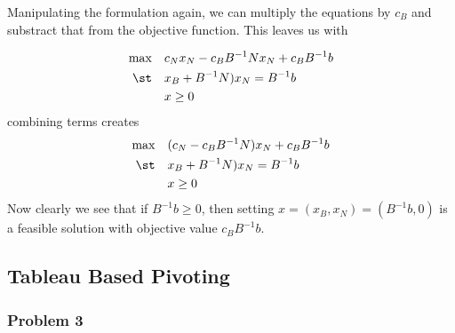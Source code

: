 Manipulating the formulation again, we can multiply the equations by $c_B$ and substract that from the objective function.  This leaves us with

 \begin{equation}
\begin{split}
\max \quad & c_N x_N - c_B B^{-1} N x_N + c_B B^{-1} b  \\
\st  \quad &x_B +  B^{-1} N) x_N = B^{-1}b\\
& x \geq 0
\end{split}
\end{equation}
combining terms creates 
 \begin{equation}
 \label{LP:basis-solution}
\begin{split}
\max \quad & (c_N  - c_B B^{-1} N) x_N + c_B B^{-1} b  \\
\st  \quad &x_B +  B^{-1} N) x_N = B^{-1}b\\
& x \geq 0
\end{split}
\end{equation}
Now clearly we see that if $B^{-1}b \geq 0$, then setting $x = (x_B, x_N) = (B^{-1}b, 0)$ is a feasible solution with objective value $c_BB^{-1} b$.

\subsection{Tableau Based Pivoting}


\newcommand{\sss}[1]{\subsubsection*{#1}}
\newcommand{\cm}{\hspace{1cm}}
 \newtheorem*{prob7}{Theorem}
 \newtheorem*{prob8}{Proposition}
\renewcommand{\v}[1]{{\vec{x}_{#1}}^\text{*}}
\newcommand{\vy}{{\vec{y}}}
\newcommand{\ox}{\overline{x}}
\renewcommand{\c}{{\bf{c}}}
\renewcommand{\a}{{\bf{a}}}
\newcommand{\x}{{\bf{x}}}
\newcommand{\A}{{\bf{A}}}
\renewcommand{\O}{{\bf{0}}}


\sss{Problem 3}


